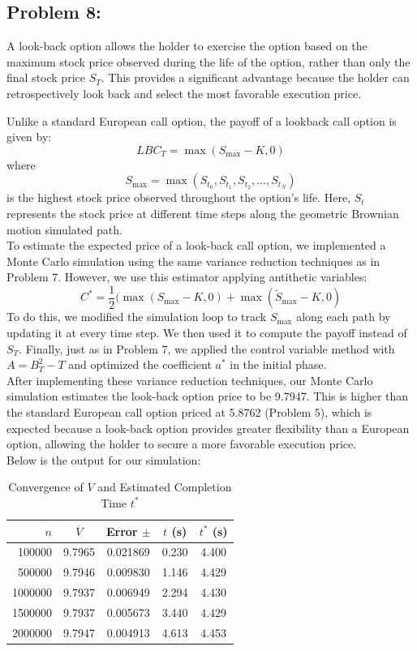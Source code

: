 \documentclass{report}
\begin{document}
\newpage
\subsection*{Problem 8:}
A look-back option allows the holder to exercise the option based on the maximum stock price observed during the life of the option, rather than only the final stock price $S_T$. This provides a significant advantage because the holder can retrospectively look back and select the most favorable execution price.

Unlike a standard European call option, the payoff of a lookback call option is given by:
\[
LBC_T = \max(S_{\max} - K, 0)
\]
where
\[
S_{\max} = \max(S_{t_0},S_{t_1},S_{t_2}, \dots, S_{t_N})
\]
is the highest stock price observed throughout the option's life. Here, $S_t$ represents the stock price at different time steps along the geometric Brownian motion simulated path. \\

To estimate the expected price of a look-back call option, we implemented a Monte Carlo simulation using the same variance reduction techniques as in Problem 7. However, we use this estimator applying antithetic variables:
\[
C^* = \frac{1}{2}(\max(S_{\max}-K,0)+\max(\widetilde{S}_{\max}-K,0)
\]
To do this, we modified the simulation loop to track $S_{\max}$ along each path by updating it at every time step. We then used it to compute the payoff instead of $S_T$. Finally, just as in Problem 7, we applied the control variable method with $A=B^2_T-T$ and optimized the coefficient $a^*$ in the initial phase. \\

After implementing these variance reduction techniques, our Monte Carlo simulation estimates the look-back option price to be 9.7947. This is higher than the standard European call option priced at 5.8762 (Problem 5), which is expected because a look-back option provides greater flexibility than a European option, allowing the holder to secure a more favorable execution price. \\

Below is the output for our simulation:

\begin{table}[H]
    \centering
    \caption{Convergence of $\overline{V}$ and Estimated Completion Time $t^*$}
    \label{tab:simulation_results}
    \begin{tabular}{rcccc}
        \hline
        $n$ & $\overline{V}$ & Error $\pm$ & $t$ (s) & $t^*$ (s) \\
        \hline
        100000  & 9.7965 & 0.021869 & 0.230 & 4.400 \\
        500000  & 9.7946 & 0.009830 & 1.146 & 4.429 \\
        1000000 & 9.7937 & 0.006949 & 2.294 & 4.430 \\
        1500000 & 9.7937 & 0.005673 & 3.440 & 4.429 \\
        2000000 & 9.7947 & 0.004913 & 4.613 & 4.453 \\
        \hline
    \end{tabular}
\end{table}
\end{document}
